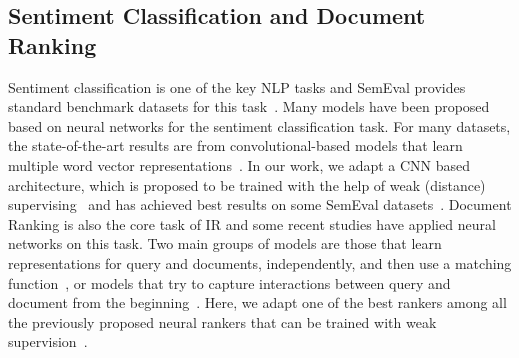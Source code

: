 \subsection{Sentiment Classification and Document Ranking}
Sentiment classification is one of the key NLP tasks and SemEval provides standard benchmark datasets for this task~\citep{rosenthal:2015,Nakov:2016,rosenthal2017semeval}. Many models have been proposed based on neural networks for the sentiment classification task. For many datasets, the state-of-the-art results are from convolutional-based models that learn multiple word vector representations~\citep{Kim:2014}. In our work, we adapt a CNN based architecture, which is proposed to be trained with the help of weak (distance) supervising~\citep{Severyn:2015:SIGIR,Severyn:2015:SemEval,Deriu2016:SemEval} and has achieved best results on some SemEval datasets~\citep{Deriu:2017}.
%
Document Ranking is also the core task of IR and some recent studies have applied neural networks on this task. Two main groups of models are those that learn representations for query and documents, independently,  and then use a matching function~\citep{Huang:2013,Mitra:2017,Shen:2014}, or models that try to capture interactions between query and document from the beginning~\citep{Lu:2013,Guo:2016,Dehghani:2017:SIGIR,Xiong:2017}. Here, we adapt one of the best rankers among all the previously proposed neural rankers that can be trained with weak supervision~\citep{Dehghani:2017:SIGIR,dehghani:2018:ICLR,neuralhype}.

